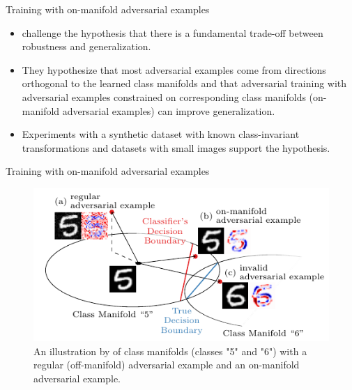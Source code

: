 \documentclass{beamer}
\newcommand{\citet}[1]{{\color{citecolor}\relscale{0.8}\textcite{#1}}}
\begin{document}
\begin{frame}[allowframebreaks=0.9]{Training with on-manifold adversarial examples}
	\begin{itemize}
		\item \citet{Stutz:2018:DARG} challenge the hypothesis that there is a fundamental trade-off between robustness and generalization. 
		
		\item They hypothesize that most adversarial examples come from directions orthogonal to the learned class manifolds and that adversarial training with adversarial examples constrained on corresponding class manifolds (on-manifold adversarial examples) can improve generalization. 
		\item Experiments with a synthetic dataset with known class-invariant transformations and datasets with small images support the hypothesis.
	\end{itemize}
\end{frame}

\begin{frame}[allowframebreaks=0.9]{Training with on-manifold adversarial examples}
	\begin{figure}
		\begin{center}
			\includegraphics[width=0.86\columnwidth]{figures/adversarial-examples/stutz-introduction_b.pdf}
		\end{center}
		\caption{An illustration by \citet{Stutz:2018:DARG} of class manifolds (classes "5" and "6") with a regular (off-manifold) adversarial example and an on-manifold adversarial example.}
		\label{fig:stutz-illustration}
	\end{figure}
\end{frame}
\end{document}

